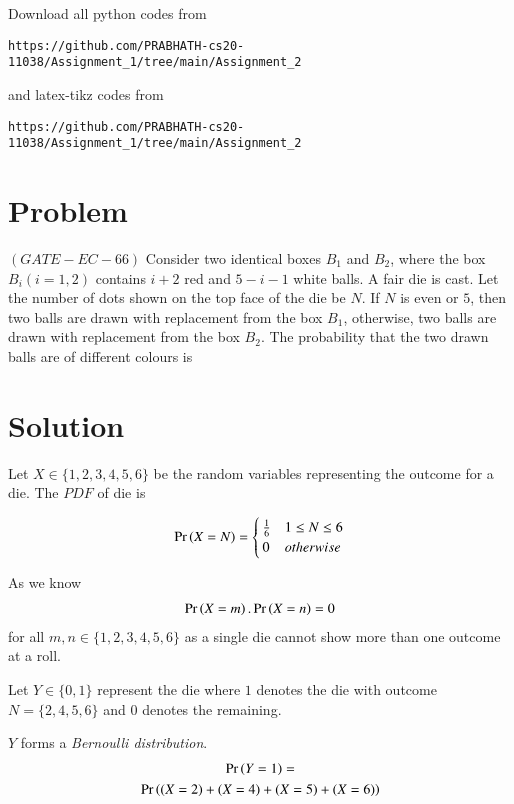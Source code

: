 \documentclass[journal,12pt,twocolumn]{IEEEtran}
\begin{document}
Download all python codes from 
\begin{lstlisting}
https://github.com/PRABHATH-cs20-11038/Assignment_1/tree/main/Assignment_2
\end{lstlisting}

and latex-tikz codes from
\begin{lstlisting}
https://github.com/PRABHATH-cs20-11038/Assignment_1/tree/main/Assignment_2
\end{lstlisting}

\section{Problem}

$(GATE-EC-66)$ Consider two identical boxes $B_1$ and $B_2$, where the box $B_i(i = 1, 2)$ contains $i + 2$ red and $5−i−1$ white balls. A fair die is cast. Let the number of dots shown on the top face of the die be $N$. If $N$ is even or $5$, then two balls are drawn with replacement from the box $B_1$, otherwise, two balls are drawn with replacement from the box $B_2$. The probability that the two drawn balls are of different colours is

\section{Solution}

Let $X \in \{1,2,3,4,5,6\}$ be the random variables representing the outcome for a die. The $PDF$ of die is

\begin{align}
    \Pr\left(X=N\right) =
    \begin{cases}
    \frac{1}{6} & 1 \leq N \leq 6\\
    0 & otherwise
    \end{cases}
\end{align}

\vspace{0.2in}

As we know
\begin{align}\label{eq1}
    \Pr\left(X=m\right).\Pr\left(X=n\right)=0
\end{align}
for all $m,n \in \{1,2,3,4,5,6\}$ as a single die cannot show more than one outcome at a roll.
\vspace{0.2in}

Let $Y \in \{0, 1\}$ represent the die where $1$ denotes the die with outcome $N = \{2,4,5,6\}$ and $0$ denotes the remaining.

$Y$ forms a \textit{Bernoulli distribution}.
\begin{multline}
    \Pr\left(Y=1\right)=\\
    \Pr\left((X=2)+(X=4)+(X=5)+(X=6)\right)
\end{multline}
\end{document}
